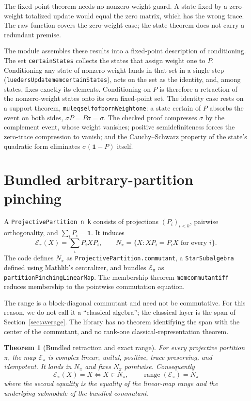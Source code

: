 \documentclass[11pt]{article}
\renewcommand{\_}{\textunderscore\allowbreak}
\newtheorem{theorem}{Theorem}
\theoremstyle{remark}
\newcommand{\one}{\mathbf 1}
\newcommand{\pinch}{\mathcal E}
\begin{document}
The fixed-point theorem needs no nonzero-weight guard. A state fixed by a
zero-weight totalized update would equal the zero matrix, which has the wrong
trace. The raw function covers the zero-weight case; the state theorem
does not carry a redundant premise.

The module assembles these results into a fixed-point description of
conditioning. The set \texttt{certainStates} collects the states that assign
weight one to $P$. Conditioning any state of nonzero weight lands in that set
in a single step (\texttt{luedersUpdate\_mem\_certainStates}), acts on the
set as the identity, and, among states, fixes exactly its elements.
Conditioning on $P$ is therefore a retraction of the nonzero-weight states
onto its own fixed-point set. The identity case rests on a support theorem,
\texttt{mul\_eq\_self\_of\_bornWeight\_one}: a state certain of $P$ absorbs
the event on both sides, $\sigma P=P\sigma=\sigma$. The checked proof
compresses $\sigma$ by the complement event, whose weight vanishes; positive
semidefiniteness forces the zero-trace compression to vanish; and the
Cauchy--Schwarz property of the state's quadratic form eliminates
$\sigma(\one-P)$ itself.

\section{Bundled arbitrary-partition pinching}
\label{sec:pinching}

A \texttt{ProjectivePartition n k} consists of projections
$(P_i)_{i<k}$, pairwise orthogonality, and $\sum_iP_i=\one$. It induces
\[
 \pinch_\pi(X)=\sum_iP_iXP_i,
 \qquad
 N_\pi=\{X:XP_i=P_iX\text{ for every }i\}.
\]
The code defines $N_\pi$ as
\texttt{ProjectivePartition.commutant}, a
\texttt{StarSubalgebra} defined using Mathlib's centralizer, and bundles
$\pinch_\pi$ as \texttt{partitionPinchingLinearMap}. The membership theorem
\texttt{mem\_commutant\_iff} reduces membership to the pointwise commutation
equation.

The range is a block-diagonal commutant and need not be commutative. For this
reason, we do not call it a ``classical algebra''; the classical layer is the
span of Section~\ref{sec:average}. The library has no theorem identifying
the span with the center of the commutant, and no rank-one
classical-representation theorem.

\begin{theorem}[Bundled retraction and exact range]
\label{thm:pinching-range}
For every projective partition $\pi$, the map $\pinch_\pi$ is complex linear,
unital, positive, trace preserving, and idempotent. It lands in $N_\pi$ and
fixes $N_\pi$ pointwise. Consequently
\[
 \pinch_\pi(X)=X \Longleftrightarrow X\in N_\pi,
 \qquad
 \operatorname{range}(\pinch_\pi)=N_\pi
\]
where the second equality is the equality of the linear-map range and the
underlying submodule of the bundled commutant.
\end{theorem}
\end{document}
